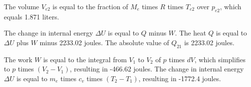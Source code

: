 The volume \( V_{e2} \) is equal to the fraction of \( M_e \) times \( R \) times \( T_{e2} \) over \( p_{e2} \), which equals 1.871 liters.

The change in internal energy \( \Delta U \) is equal to \( Q \) minus \( W \). The heat \( Q \) is equal to \( \Delta U \) plus \( W \) minus 2233.02 joules. The absolute value of \( Q_{21} \) is 2233.02 joules.

The work \( W \) is equal to the integral from \( V_1 \) to \( V_2 \) of \( p \) times \( dV \), which simplifies to \( p \) times \( (V_2 - V_1) \), resulting in -466.62 joules. The change in internal energy \( \Delta U \) is equal to \( m_e \) times \( c_v \) times \( (T_2 - T_1) \), resulting in -1772.4 joules.